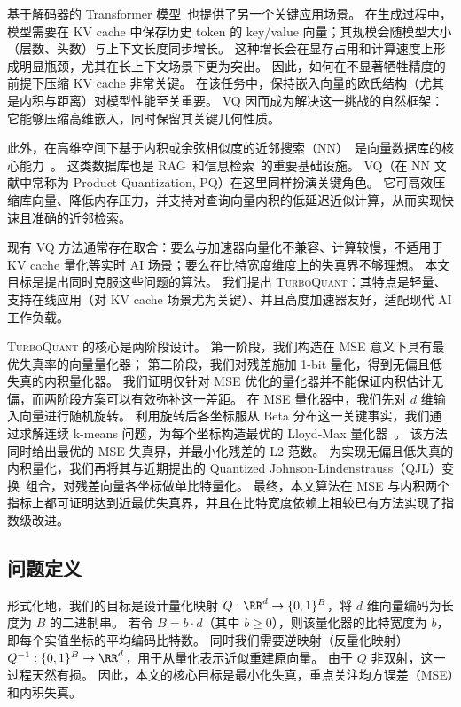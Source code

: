 \documentclass[11pt]{ctexart}
\newcommand{\TurboQuant}{\textsc{TurboQuant}\xspace}
\begin{document}
基于解码器的 Transformer 模型~\cite{vaswani2017attention}也提供了另一个关键应用场景。
在生成过程中，模型需要在 KV cache 中保存历史 token 的 key/value 向量；其规模会随模型大小（层数、头数）与上下文长度同步增长。 
这种增长会在显存占用和计算速度上形成明显瓶颈，尤其在长上下文场景下更为突出。 
因此，如何在不显著牺牲精度的前提下压缩 KV cache 非常关键。
在该任务中，保持嵌入向量的欧氏结构（尤其是内积与距离）对模型性能至关重要。 
VQ 因而成为解决这一挑战的自然框架：它能够压缩高维嵌入，同时保留其关键几何性质。


此外，在高维空间下基于内积或余弦相似度的近邻搜索（NN）~\cite{elasticsearch, guo2020accelerating}是向量数据库的核心能力~\cite{pinecone, gdrant, pgvector}。
这类数据库也是 RAG~\cite{gao2023retrieval, edge2024local}和信息检索~\cite{khattab2020colbert, santhanam2021colbertv2}的重要基础设施。 
VQ（在 NN 文献中常称为 Product Quantization, PQ）在这里同样扮演关键角色。 
它可高效压缩库向量、降低内存压力，并支持对查询向量内积的低延迟近似计算，从而实现快速且准确的近邻检索。

现有 VQ 方法通常存在取舍：要么与加速器向量化不兼容、计算较慢，不适用于 KV cache 量化等实时 AI 场景；要么在比特宽度维度上的失真界不够理想。
本文目标是提出同时克服这些问题的算法。
我们提出 \TurboQuant：其特点是轻量、支持在线应用（对 KV cache 场景尤为关键）、并且高度加速器友好，适配现代 AI 工作负载。 

\TurboQuant 的核心是两阶段设计。 
第一阶段，我们构造在 MSE 意义下具有最优失真率的向量量化器； 
第二阶段，我们对残差施加 1-bit 量化，得到无偏且低失真的内积量化器。 
我们证明仅针对 MSE 优化的量化器并不能保证内积估计无偏，而两阶段方案可以有效弥补这一差距。
在 MSE 量化器中，我们先对 $d$ 维输入向量进行随机旋转。 
利用旋转后各坐标服从 Beta 分布这一关键事实，我们通过求解连续 k-means 问题，为每个坐标构造最优的 Lloyd-Max 量化器~\cite{lloyd1982least, max1960quantizing}。
该方法同时给出最优的 MSE 失真界，并最小化残差的 L2 范数。
为实现无偏且低失真的内积量化，我们再将其与近期提出的 Quantized Johnson-Lindenstrauss（QJL）变换~\cite{qjl}组合，对残差向量各坐标做单比特量化。
最终，本文算法在 MSE 与内积两个指标上都可证明达到近最优失真界，并且在比特宽度依赖上相较已有方法实现了指数级改进。


\subsection{问题定义}

形式化地，我们的目标是设计量化映射 $Q: \RR^d \to \{ 0, 1 \}^B$，将 $d$ 维向量编码为长度为 $B$ 的二进制串。
若令 $B = b \cdot d$（其中 $b \ge 0$），则该量化器的比特宽度为 $b$，即每个实值坐标的平均编码比特数。
同时我们需要逆映射（反量化映射）$Q^{-1}: \{ 0, 1 \}^B \to \RR^d$，用于从量化表示近似重建原向量。
由于 $Q$ 非双射，这一过程天然有损。 
因此，本文的核心目标是最小化失真，重点关注均方误差（MSE）和内积失真。 
\end{document}
